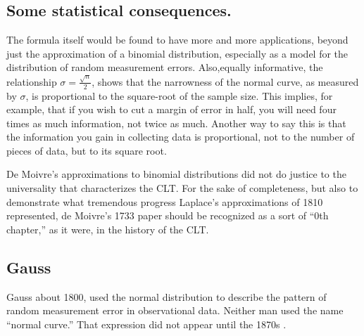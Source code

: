 \documentclass{article}
\begin{document}
\subsection{Some statistical consequences.}
The formula itself would be found to have more and more applications, beyond just the approximation of a binomial distribution, especially as a model for the distribution of random measurement errors. Also,equally informative, the relationship $ \sigma = \frac{\sqrt{n}}{2}$, shows that the narrowness of the normal curve, as measured by $\sigma$, is proportional to the square-root of the sample size. This implies, for example, that if you wish to cut a margin of error in half, you will need four times as much information, not twice as much. Another way to say this is that the information you gain in collecting data is proportional, not to the number of pieces of data, but to its square root.

De Moivre’s approximations to binomial distributions did not do justice to the universality that characterizes the CLT. For the sake of completeness, but also to demonstrate what tremendous progress Laplace’s approximations of 1810 represented, de Moivre’s 1733 paper should be recognized as a sort of “0th chapter,” as it were, in the history of the CLT.

\subsection{Gauss}
Gauss about 1800, used the normal distribution to describe the pattern of random measurement error in observational data. Neither man used the name “normal curve.” That expression did not appear until the 1870s \cite{fd7a87fc9eff4e9c9ce8b351cb000eb8}.
\end{document}
